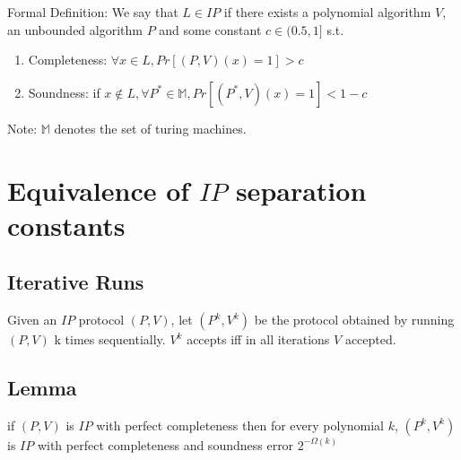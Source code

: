 Formal Definition:
We say that $L\in IP$ if there exists a polynomial algorithm $V$, an unbounded algorithm $P$ and some constant $c\in (0.5, 1]$ s.t.
\begin{enumerate}
    \item Completeness: $\forall x\in L, Pr[(P,V)(x)=1]>c$
    \item Soundness: if $x\notin L,\forall P^*\in\mathbb{M}, Pr[(P^*,V)(x)=1]<1-c$
\end{enumerate}
Note: $\mathbb{M}$ denotes the set of turing machines.


\section*{Equivalence of $IP$ separation constants}
\subsection*{Iterative Runs}
Given an $IP$ protocol $(P,V)$, let $(P^k,V^k)$ be the protocol obtained by running $(P,V)$ k times sequentially. $V^k$ accepts iff in all iterations $V$ accepted.

\subsection*{Lemma}
if $(P,V)$ is $IP$ with perfect completeness then for every polynomial $k$, $(P^k, V^k)$ is $IP$ with perfect completeness and soundness error $2^{-\Omega (k)}$

